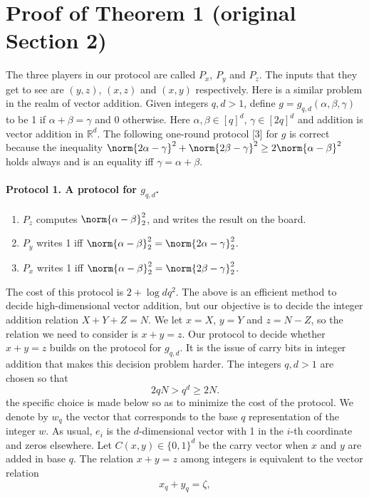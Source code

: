 \section*{Proof of Theorem 1 (original Section 2)}
The three players in our protocol are called $P_x$, $P_y$ and $P_z$. The inputs that they get to see are $(y,z)$, $(x,z)$ and $(x,y)$ respectively.
Here is a similar problem in the realm of vector addition. Given integers $q,d>1$, define $g=g_{q,d}(\alpha,\beta,\gamma)$ to be 1 if $\alpha+\beta=\gamma$ and 0 otherwise. Here $\alpha,\beta\in[q]^d$, $\gamma\in[2q]^d$ and addition is vector addition in $\mathbb R^d$. The following one-round protocol [3] for $g$ is correct because the inequality $\norm{2\alpha-\gamma}^2+\norm{2\beta-\gamma}^2\ge2\norm{\alpha-\beta}^2$ holds always and is an equality iff $\gamma=\alpha+\beta$.
\paragraph{Protocol 1. A protocol for $g_{q,d}$.}
\begin{enumerate}
\item $P_z$ computes $\norm{\alpha-\beta}_2^2$, and writes the result on the board.
\item $P_y$ writes 1 iff $\norm{\alpha-\beta}_2^2=\norm{2\alpha-\gamma}_2^2$.
\item $P_x$ writes 1 iff $\norm{\alpha-\beta}_2^2=\norm{2\beta-\gamma}_2^2$.
\end{enumerate}
The cost of this protocol is $2+\log dq^2$.
The above is an efficient method to decide high-dimensional vector addition, but our objective is to decide the integer addition relation $X+Y+Z=N$. We let $x=X$, $y=Y$ and $z=N-Z$, so the relation we need to consider is $x+y=z$.
Our protocol to decide whether $x+y=z$ builds on the protocol for $g_{q,d}$. It is the issue of carry bits in integer addition that makes this decision problem harder. The integers $q,d>1$ are chosen so that
\begin{equation}2qN>q^d\ge2N.\tag{3}\label{eq:range}\end{equation}
the specific choice is made below so as to minimize the cost of the protocol.
We denote by $w_q$ the vector that corresponds to the base $q$ representation of the integer $w$. As usual, $e_i$ is the $d$-dimensional vector with 1 in the $i$-th coordinate and zeros elsewhere.
Let $C(x,y)\in\{0,1\}^d$ be the carry vector when $x$ and $y$ are added in base $q$. The relation $x+y=z$ among integers is equivalent to the vector relation
\[x_q+y_q=\zeta,\]
